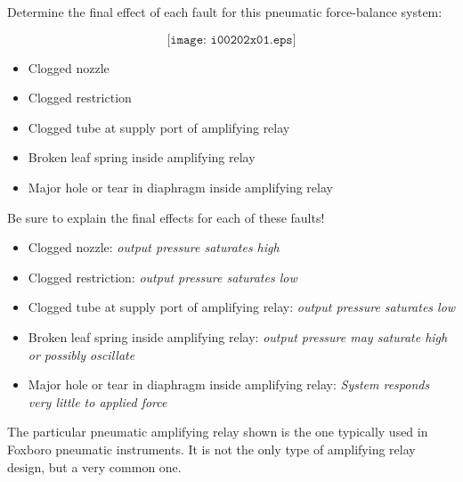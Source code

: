 

Determine the final effect of each fault for this pneumatic force-balance system:

$$\texttt{[image: i00202x01.eps]}$$

\begin{itemize}
\item{} Clogged nozzle
\item{} Clogged restriction
\item{} Clogged tube at supply port of amplifying relay
\item{} Broken leaf spring inside amplifying relay
\item{} Major hole or tear in diaphragm inside amplifying relay
\end{itemize}

Be sure to explain the final effects for each of these faults!







\begin{itemize}
\item{} Clogged nozzle: {\it output pressure saturates high}
\item{} Clogged restriction: {\it output pressure saturates low}
\item{} Clogged tube at supply port of amplifying relay: {\it output pressure saturates low}
\item{} Broken leaf spring inside amplifying relay: {\it output pressure may saturate high or possibly oscillate}
\item{} Major hole or tear in diaphragm inside amplifying relay: {\it System responds very little to applied force}
\end{itemize}







The particular pneumatic amplifying relay shown is the one typically used in Foxboro pneumatic instruments.  It is not the only type of amplifying relay design, but a very common one.




